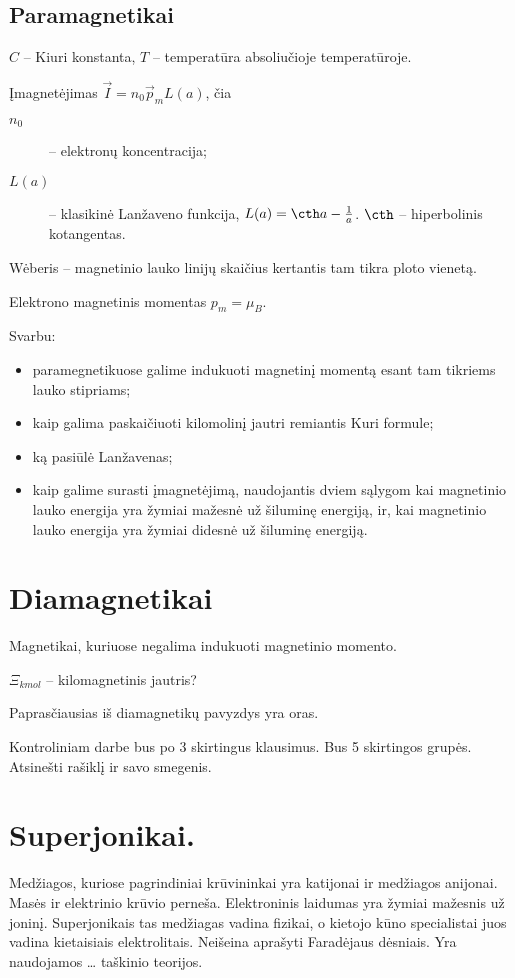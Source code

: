 \subsection{Paramagnetikai}

$C$ – Kiuri konstanta,
$T$ – temperatūra absoliučioje temperatūroje.

Įmagnetėjimas $\vec{I} = n_{0}\vec{p}_{m}L(a)$, čia
\begin{description}
  \item[$n_{0}$] – elektronų koncentracija;
  \item[$L(a)$] – klasikinė Lanžaveno funkcija,
    $L(a) = \cth a - \frac{1}{a}$. $\cth$ – hiperbolinis kotangentas.
\end{description}

Wėberis – magnetinio lauko linijų skaičius kertantis tam tikra ploto
vienetą.

Elektrono magnetinis momentas $p_{m} = \mu_{B}$.

Svarbu:
\begin{itemize}
  \item paramegnetikuose galime indukuoti magnetinį momentą esant
    tam tikriems lauko stipriams;
  \item kaip galima paskaičiuoti kilomolinį jautri remiantis Kuri
    formule;
  \item ką pasiūlė Lanžavenas;
  \item kaip galime surasti įmagnetėjimą, naudojantis dviem sąlygom
    kai magnetinio lauko energija yra žymiai mažesnė už šiluminę
    energiją, ir, kai magnetinio lauko energija yra žymiai didesnė
    už šiluminę energiją.
\end{itemize}

\section{Diamagnetikai}

Magnetikai, kuriuose negalima indukuoti magnetinio momento.

$\Xi_{kmol}$ – kilomagnetinis jautris?

Paprasčiausias iš diamagnetikų pavyzdys yra oras.

Kontroliniam darbe bus po 3 skirtingus klausimus. Bus 5 skirtingos
grupės. Atsinešti rašiklį ir savo smegenis.

\section{Superjonikai.}
Medžiagos, kuriose pagrindiniai krūvininkai yra katijonai ir medžiagos
anijonai. Masės ir elektrinio krūvio perneša. Elektroninis laidumas yra
žymiai mažesnis už joninį. Superjonikais tas medžiagas vadina fizikai,
o kietojo kūno specialistai juos vadina kietaisiais elektrolitais.
Neišeina aprašyti Faradėjaus dėsniais. Yra naudojamos … taškinio teorijos.
